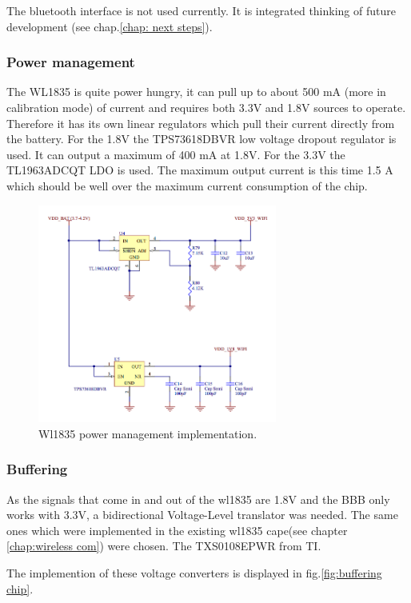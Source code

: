 The bluetooth interface is not used currently. It is integrated thinking of future development (see chap.\ref{chap: next steps}).

\subsubsection{Power management}
The WL1835 is quite power hungry, it can pull up to about 500 mA (more in calibration mode) of current and requires both 3.3V and 1.8V sources to operate. Therefore it has its own linear regulators which pull their current directly from the battery. For the 1.8V the TPS73618DBVR low voltage dropout regulator is used. It can output a maximum of 400 mA at 1.8V. For the 3.3V the TL1963ADCQT LDO is used. The maximum output current is this time 1.5 A which should be well over the maximum current consumption of the chip.


\begin{figure}[!ht]
    \centering
    \includegraphics[width=0.7\textwidth,keepaspectratio]{chap/hardFig/wl1835_power_sch}
    \caption{Wl1835 power management implementation.}
    \label{fig:power management}
\end{figure}

\subsubsection{Buffering}
As the signals that come in and out of the wl1835 are 1.8V and the BBB only works with 3.3V, a bidirectional Voltage-Level translator was needed. The same ones which were implemented in the existing wl1835 cape(see chapter \ref{chap:wireless com}) were chosen. The TXS0108EPWR from TI.

The implemention of these voltage converters is displayed in fig.\ref{fig:buffering chip}.

